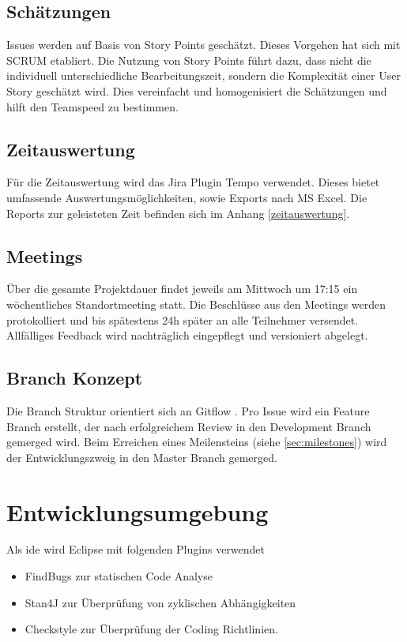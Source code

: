 \documentclass[11pt,a4paper,english,oneside]{book}
\numberwithin{equation}{chapter}
\begin{document}
	\subsection{Schätzungen}
	\label{sec:estimations}
	Issues werden auf Basis von Story Points geschätzt. Dieses Vorgehen hat sich mit SCRUM etabliert. Die Nutzung von Story Points führt dazu, dass nicht die individuell unterschiedliche Bearbeitungszeit, sondern die Komplexität einer User Story geschätzt wird. Dies vereinfacht  und homogenisiert die Schätzungen und hilft den Teamspeed zu bestimmen.\cite{storypoints, storypoints2}
	
	\subsection{Zeitauswertung}
	Für die Zeitauswertung wird das Jira Plugin Tempo \cite{jiratempo} verwendet. Dieses bietet umfassende Auswertungsmöglichkeiten, sowie Exports nach MS Excel. Die Reports zur geleisteten Zeit befinden sich im Anhang \ref{zeitauswertung}.
	
	\subsection{Meetings} \label{ssec:meeting}
	Über die gesamte Projektdauer findet jeweils am Mittwoch um 17:15 ein wöchentliches Standortmeeting statt. Die Beschlüsse aus den Meetings werden protokolliert und bis spätestens 24h später an alle Teilnehmer versendet. Allfälliges Feedback wird nachträglich eingepflegt und versioniert abgelegt.
	
	\subsection{Branch Konzept}
	Die Branch Struktur orientiert sich an Gitflow \cite{gitflow}. Pro Issue wird ein Feature Branch erstellt, der nach erfolgreichem Review in den Development Branch gemerged wird. Beim Erreichen eines Meilensteins (siehe \ref{sec:milestones}) wird der Entwicklungszweig in den Master Branch gemerged.
	
	\section{Entwicklungsumgebung}
	Als \gls{ide} wird Eclipse mit folgenden Plugins verwendet
	\begin{itemize}
		\item FindBugs \cite{findbugs} zur statischen Code Analyse
		\item Stan4J \cite{stan4j} zur Überprüfung von zyklischen Abhängigkeiten
		\item Checkstyle \cite{checkstyle} zur Überprüfung der Coding Richtlinien.
	\end{itemize}
\end{document}
